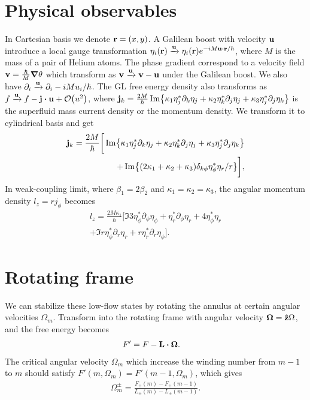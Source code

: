 \documentclass[aps,prl,preprint]{revtex4-2}
\begin{document}
\section{Physical observables}
In Cartesian basis we denote $\vb{r} = (x, y)$.
A Galilean boost with velocity $\vb{u}$ introduce a local gauge transformation
$\eta_i(\vb{r}) \xrightarrow{\vb{u}} \eta_i(\vb{r}) e^{-iM\vb{u}\vdot\vb{r}/\hbar}$,
where $M$ is the mass of a pair of Helium atoms. The phase gradient correspond to a velocity field
$\vb{v} = \frac{\hbar}{M}\grad{\theta}$ which transform as
$\vb{v} \xrightarrow{\vb{u}} \vb{v} - \vb{u}$ under the Galilean boost. We also have
$\partial_i \xrightarrow{\vb{u}} \partial_i - iMu_i/\hbar$.
The GL free energy density also transforms as
$f\xrightarrow{\vb{u}}f - \vb{j}\vdot\vb{u} + \order{u^2}$, where
$\vb{j}_k = \frac{2M}{\hbar}\Im{\kappa_1\eta_j^*\partial_k\eta_j + \kappa_2\eta_k^*\partial_j\eta_j + \kappa_3\eta_j^*\partial_j\eta_k}$
is the superfluid mass current density or the momentum density.
We transform it to cylindrical basis and get
\begin{align}\label{j}
    \vb{j}_k=\frac{2M}{\hbar}\bigg[\Im{\kappa_1\eta_j^*\partial_k\eta_j+\kappa_2\eta_k^*\partial_j\eta_j+\kappa_3\eta_j^*\partial_j\eta_k}\nonumber\\
    +\Im{(2\kappa_1+\kappa_2+\kappa_3)\delta_{k\phi}\eta_\phi^*\eta_r/r}\bigg],
\end{align}
In weak-coupling limit,
where $\beta_1=2\beta_2$ and $\kappa_1=\kappa_2=\kappa_3$, the angular momentum
density $l_z=rj_\phi$ becomes
\begin{align}\label{l_density}
     l_z=\frac{2M\kappa_1}{\hbar}\bigg[\Im{3\eta_\phi^*\partial_\phi\eta_\phi+\eta_r^*\partial_\phi\eta_r+4\eta_\phi^*\eta_r}\nonumber\\
     +\Im{r\eta_\phi^*\partial_r\eta_r+r\eta_r^*\partial_r\eta_\phi}\bigg].
\end{align}

\section{Rotating frame}

We can stabilize these low-flow states by rotating the annulus at
certain angular velocities $\Omega_m$. Transform into the rotating frame
with angular velocity $\vb{\Omega}=\vu{z}\Omega$, and the free energy becomes
\begin{align}
    F'&=F-\vb{L}\vdot\vb{\Omega}.
\end{align}
The critical angular velocity $\Omega_m$ which increase the winding number from $m-1$ to $m$ should
satisfy $F'(m,\Omega_m)=F'(m-1,\Omega_m)$, which gives
\begin{align}
    \Omega_m^\pm=\frac{F_\pm(m) - F_\pm(m-1)}{L_\pm(m) - L_\pm(m-1)}. \label{omega_m}
\end{align}
\end{document}
